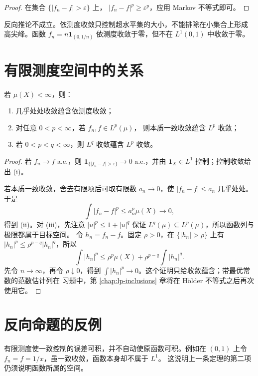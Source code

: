 \begin{proof}
在集合 \(\{|f_n-f|>\varepsilon\}\) 上，
\(|f_n-f|^p\ge\varepsilon^p\)，应用 Markov 不等式即可。
\end{proof}

反向推论不成立。依测度收敛只控制超水平集的大小，不能排除在小集合上形成
高尖峰。函数 \(f_n=n\mathbf1_{(0,1/n)}\) 依测度收敛于零，但不在
\(L^1(0,1)\) 中收敛于零。

\section{有限测度空间中的关系}

\begin{theorem}
\label{thm:finite-measure-convergence-relations}
若 \(\mu(X)<\infty\)，则：
\begin{enumerate}[label=\textup{(\roman*)}]
 \item 几乎处处收敛蕴含依测度收敛；
 \item 对任意 \(0<p<\infty\)，若 \(f_n,f\in L^p(\mu)\)，
 则本质一致收敛蕴含 \(L^p\) 收敛；
 \item 若 \(0<p<q<\infty\)，则 \(L^q\) 收敛蕴含 \(L^p\) 收敛。
\end{enumerate}
\end{theorem}

\begin{proof}
若 \(f_n\to f\) a.e.，则
\(\mathbf1_{\{|f_n-f|>\varepsilon\}}\to0\) a.e.，并由
\(\mathbf1_X\in L^1\) 控制；控制收敛给出 (i)。

若本质一致收敛，舍去有限项后可取有限数 \(a_n\to0\)，使
\(|f_n-f|\le a_n\) 几乎处处。于是
\[
 \int|f_n-f|^p\le a_n^p\mu(X)\to0,
\]
得到 (ii)。对 (iii)，先注意 \(|u|^p\le1+|u|^q\) 保证
\(L^q(\mu)\subseteq L^p(\mu)\)，所以函数列与极限都属于目标空间。
令 \(h_n=f_n-f\)。固定 \(\rho>0\)，在
\(\{|h_n|>\rho\}\) 上有
\(|h_n|^p\le\rho^{p-q}|h_n|^q\)，所以
\[
 \int|h_n|^p
 \le \rho^p\mu(X)+\rho^{p-q}\int|h_n|^q.
\]
先令 \(n\to\infty\)，再令 \(\rho\downarrow0\)，得到
\(\int|h_n|^p\to0\)。这个证明只给收敛蕴含；带最优常数的范数估计列在
习题中，第 \ref{chap:lp-inclusions} 章将在 Hölder 不等式之后再次使用它。
\end{proof}

\section{反向命题的反例}

有限测度使一致控制的误差可积，并不自动使原函数可积。例如在 \((0,1)\)
上令 \(f_n=f=1/x\)，虽一致收敛，函数本身却不属于 \(L^1\)。
这说明上一条定理的第二项仍须说明函数所属的空间。

